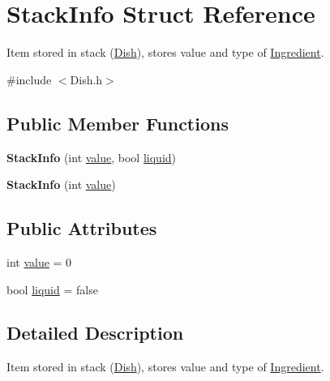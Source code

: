 \hypertarget{structStackInfo}{\section{Stack\-Info Struct Reference}
\label{structStackInfo}
}


Item stored in stack (\hyperlink{classDish}{Dish}), stores value and type of \hyperlink{classIngredient}{Ingredient}.  




{\ttfamily \#include $<$Dish.\-h$>$}

\subsection*{Public Member Functions}
\begin{DoxyCompactItemize}
\item 
\hypertarget{structStackInfo_a7467cd2b3ae94d00c3b5beb206bc2a91}{{\bfseries Stack\-Info} (int \hyperlink{structStackInfo_a14e308ce84edd0276ae34990f7891212}{value}, bool \hyperlink{structStackInfo_a37ea92877d69ca4e88f5820d4eab787b}{liquid})}\label{structStackInfo_a7467cd2b3ae94d00c3b5beb206bc2a91}

\item 
\hypertarget{structStackInfo_ab6d7a48b1fd4c454ba28977d631eb40c}{{\bfseries Stack\-Info} (int \hyperlink{structStackInfo_a14e308ce84edd0276ae34990f7891212}{value})}\label{structStackInfo_ab6d7a48b1fd4c454ba28977d631eb40c}

\end{DoxyCompactItemize}
\subsection*{Public Attributes}
\begin{DoxyCompactItemize}
\item 
int \hyperlink{structStackInfo_a14e308ce84edd0276ae34990f7891212}{value} = 0
\item 
bool \hyperlink{structStackInfo_a37ea92877d69ca4e88f5820d4eab787b}{liquid} = false
\end{DoxyCompactItemize}


\subsection{Detailed Description}
Item stored in stack (\hyperlink{classDish}{Dish}), stores value and type of \hyperlink{classIngredient}{Ingredient}. 

